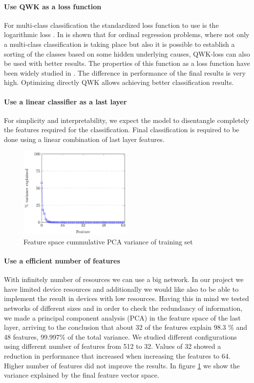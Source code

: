 \documentclass[review]{elsarticle}
\theoremstyle{definition} %
\theoremstyle{remark}
\begin{document}
\paragraph{Use QWK as a loss function} For multi-class classification the standardized loss function to use is the logarithmic loss \cite{Goodfellow-et-al-2016}. In \cite{DELATORRE2017} is shown that for ordinal regression problems, where not only a multi-class classification is taking place but also it is possible to establish a sorting of the classes based on some hidden underlying causes, QWK-loss can also be used with better results. The properties of this function as a loss function have been widely studied in \cite{DELATORRE2017}. The difference in performance of the final results is very high. Optimizing directly QWK allows achieving better classification results.

\paragraph{Use a linear classifier as a last layer} For simplicity and interpretability, we expect the model to disentangle completely the features required for the classification. Final classification is required to be done using a linear combination of last layer features.

\begin{figure}[ht!]
	\centering
	\includegraphics[width=0.50\textwidth]{./figures/PCA_feature_space.pdf}
	\caption{Feature space cummulative PCA variance of training set}
	\label{fig:pca_graph}
\end{figure}

\paragraph{Use a efficient number of features} With infinitely number of resources we can use a big network. In our project we have limited device resources and additionally we would like also to be able to implement the result in devices with low resources. Having this in mind we tested networks of different sizes and in order to check the redundancy of information, we made a principal component analysis (PCA) in the feature space of the last layer, arriving to the conclusion that about 32 of the features explain 98.3 \% and 48 features, 99.997\% of the total variance. We studied different configurations using different number of features from 512 to 32. Values of 32 showed a reduction in performance that increased when increasing the features to 64. Higher number of features did not improve the results. In figure \ref{fig:pca_graph} we show the variance explained by the final feature vector space.
\end{document}
